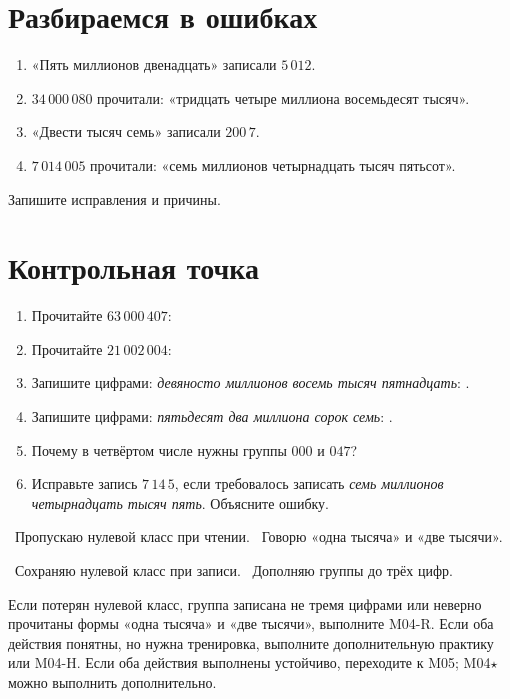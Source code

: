 \section{Разбираемся в ошибках}

\begin{warningbox}
  \begin{enumerate}[label=\textbf{\arabic*.}]
    \item «Пять миллионов двенадцать» записали \(5\,012\).
    \item \(34\,000\,080\) прочитали: «тридцать четыре миллиона восемьдесят
      тысяч».
    \item «Двести тысяч семь» записали \(200\,7\).
    \item \(7\,014\,005\) прочитали: «семь миллионов четырнадцать тысяч
      пятьсот».
  \end{enumerate}
  Запишите исправления и причины.
\end{warningbox}

\newpage
\section{Контрольная точка}

\begin{checkpointbox}
  \begin{enumerate}[label=\textbf{\arabic*.}]
    \item Прочитайте \(63\,000\,407\):
    \item Прочитайте \(21\,002\,004\):
    \item Запишите цифрами: \emph{девяносто миллионов восемь тысяч
      пятнадцать}: \answerblank[40mm].
    \item Запишите цифрами: \emph{пятьдесят два миллиона сорок семь}:
      \answerblank[40mm].
    \item Почему в четвёртом числе нужны группы \(000\) и \(047\)?
    \item Исправьте запись \(7\,14\,5\), если требовалось записать
      \emph{семь миллионов четырнадцать тысяч пять}. Объясните ошибку.
  \end{enumerate}
\end{checkpointbox}

\begin{reflectionbox}
  \choicebox\ Пропускаю нулевой класс при чтении.
  \quad
  \choicebox\ Говорю «одна тысяча» и «две тысячи».

  \choicebox\ Сохраняю нулевой класс при записи.
  \quad
  \choicebox\ Дополняю группы до трёх цифр.
\end{reflectionbox}

\begin{notebox}
  Если потерян нулевой класс, группа записана не тремя цифрами или неверно
  прочитаны формы «одна тысяча» и «две тысячи», выполните M04-R. Если оба
  действия понятны, но нужна тренировка, выполните дополнительную практику
  или M04-H. Если оба действия выполнены устойчиво, переходите к M05;
  M04\(\star\) можно выполнить дополнительно.
\end{notebox}
